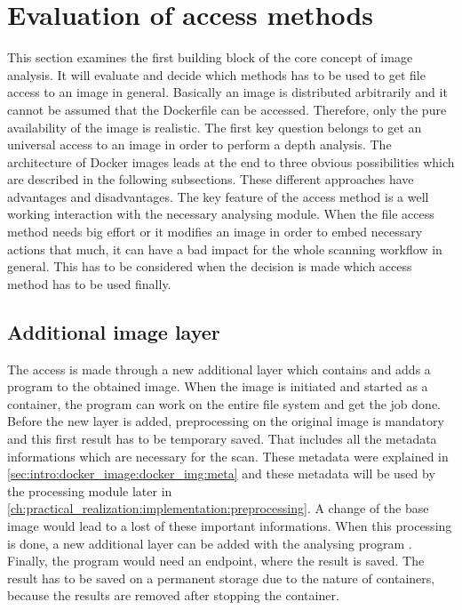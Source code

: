 \section{Evaluation of access methods}
\label{ch:theory:access_eval}
This section examines the first building block of the core concept of image analysis. It will evaluate and decide which methods has to be used to get file access to an image in general.
Basically an image is distributed arbitrarily and it cannot be assumed that the Dockerfile can be accessed.
Therefore, only the pure availability of the image is realistic. The first key question belongs to get an universal access to an image in order to perform a depth analysis.
The architecture of Docker images leads at the end to three obvious possibilities which are described in the following subsections.
These different approaches have advantages and disadvantages. The key feature of the access method is a well working interaction with the necessary analysing module. When the file access method needs big effort or it modifies an image in order to embed necessary actions that much, it can have a bad impact for the whole scanning workflow in general. This has to be considered when the decision is made which access method has to be used finally.

\subsection{Additional image layer} 
\label{ch:theory:access_eval:additional}
The access is made through a new additional layer which contains and adds a program to the obtained image. When the image is initiated and started as a container, the program can work on the entire file system and get the job done.
Before the new layer is added, preprocessing on the original image is mandatory and this first result has to be temporary saved. That includes all the metadata informations which are necessary for the scan. These metadata were explained in \ref{sec:intro:docker_image:docker_img:meta} and these metadata will be used by the processing module later in \ref{ch:practical_realization:implementation:preprocessing}. A change of the base image would lead to a lost of these important informations. When this processing is done, a new additional layer can be added with the analysing program .
Finally, the program would need an endpoint, where the result is saved. The result has to be saved on a permanent storage due to the nature of containers, because the results are removed after stopping the container. 

